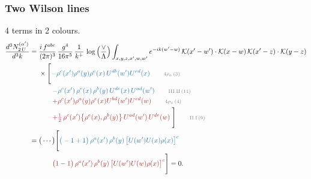 \documentclass[10pt]{article}
\begin{document}
\subsubsection{Two Wilson lines}
4 terms in 2 colours.
\begin{align}
\frac{d^{3}N^{(\alpha')}_{2\,U}}{d^{3}k}={}&\frac{i\,f^{abc}}{(2\pi)^{3}}\,\frac{g^{4}}{16\pi^{5}}\,\frac{1}{k^{+}}\,\log\Big(\frac{\vee}{\Lambda}\Big)\int_{x,y,z,x',w,w'}e^{-ik(w'-w)}\,\mathcal{K}(x'-w')\cdot\mathcal{K}(x-w)\,\mathcal{K}(x'-z)\cdot\mathcal{K}(y-z)\notag\\
&\times\Bigg[{\color{RoyalBlue}-\rho^{c}(x') \rho^{a}(y) \rho^{e}(x)\,U^{d b}(w') U^{e d}(x)}\tag*{\color{gray}\scriptsize $4\rho_a$\,(3)}\\
&\qquad{\color{RoyalBlue}-\rho^{c}(x')\,\rho^{e}(x)\,\rho^{b}(y)\,U^{de}(x)\,U^{ad}(w')}\tag*{\color{gray}\scriptsize III.II\,(11)}\\
&\qquad{\color{BrickRed}+\rho^{c}(x') \rho^{a}(y) \rho^{e}(x) U^{b d}(w') U^{e d}(w)}\tag*{\color{gray}\scriptsize $4\rho_a$\,(4)}\\
&\qquad{\color{BrickRed}+\tfrac{1}{2}\,\rho^{c}(x')\big\{\rho^{e}(x),\rho^{b}(y)\big\}\,U^{ad}(w')\,U^{de}(w)}\;\Bigg]\tag*{\color{gray}\scriptsize II.I\,(9)}\\
={}&\big(\cdots\big)\Bigg[{\color{RoyalBlue}\big(-1+1\big)\,\rho^{a}(x')\,\rho^{b}(y)\,\big[U(w')U(x)\rho(x)\big]^{c}}\notag\\
&\qquad{\color{BrickRed}\big(1-1\big)\,\rho^{a}(x')\,\rho^{b}(y)\,\big[U(w')U(w)\rho(x)\big]^{c}}\Bigg]=0.
\end{align}
\end{document}
